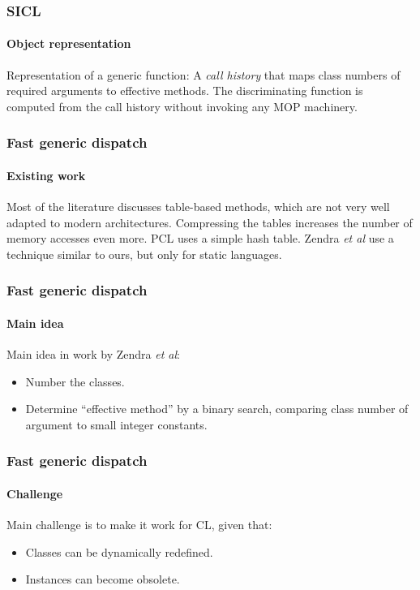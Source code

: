 \documentclass[12pt]{beamer}
\begin{document}
\begin{frame}
  \frametitle{SICL}
  \framesubtitle{Object representation}

  Representation of a generic function:
  \vskip 0.25cm
  A \emph{call history} that maps class numbers of required arguments
  to effective methods. 
  \vskip 0.25cm
  The discriminating function is computed from the call history
  without invoking any MOP machinery. 

\end{frame}
\begin{frame}
  \frametitle{Fast generic dispatch}
  \framesubtitle{Existing work}

  Most of the literature discusses table-based methods, which are not
  very well adapted to modern architectures.  Compressing the tables
  increases the number of memory accesses even more.
  \vskip 0.5cm
  PCL uses a simple hash table.
  \vskip 0.5cm
  Zendra \emph{et al} use a technique similar to ours, but only for
  static languages.

\end{frame}
\begin{frame}
  \frametitle{Fast generic dispatch}
  \framesubtitle{Main idea}

  Main idea in work by Zendra \emph{et al}:

  \begin{itemize}
  \item Number the classes.
  \item Determine ``effective method'' by a binary search, comparing
    class number of argument to small integer constants.
  \end{itemize}

\end{frame}
\begin{frame}
  \frametitle{Fast generic dispatch}
  \framesubtitle{Challenge}

  Main challenge is to make it work for CL, given that:

  \begin{itemize}
  \item Classes can be dynamically redefined.
  \item Instances can become obsolete.
  \end{itemize}

\end{frame}
\end{document}
